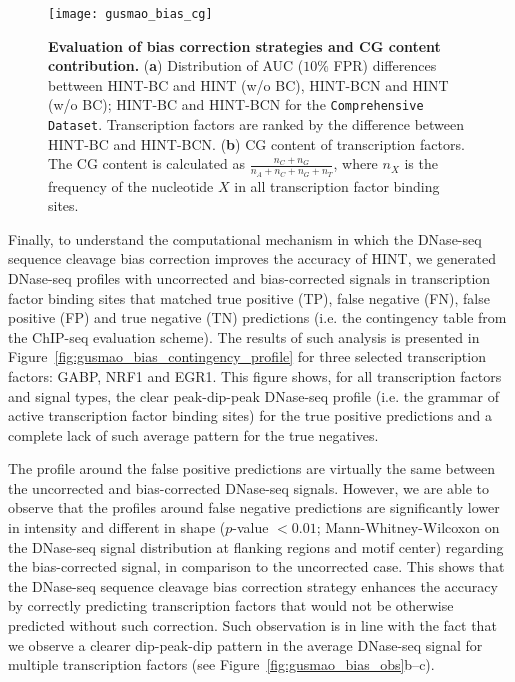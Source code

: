 \begin{figure}[h!]
\centering
\texttt{[image: gusmao\_bias\_cg]}
\caption[Evaluation of bias correction strategies and CG content contribution]{\textbf{Evaluation of bias correction strategies and CG content contribution.} (\textbf{a}) Distribution of AUC ($10\%$ FPR) differences bettween HINT-BC and HINT (w/o BC), HINT-BCN and HINT (w/o BC); HINT-BC and HINT-BCN for the {\tt Comprehensive Dataset}. Transcription factors are ranked by the difference between HINT-BC and HINT-BCN. (\textbf{b}) CG content of transcription factors. The CG content is calculated as $\frac{n_C+n_G}{n_A+n_C+n_G+n_T}$, where $n_X$ is the frequency of the nucleotide $X$ in all transcription factor binding sites.}
\label{fig:gusmao_bias_cg}
\end{figure}

Finally, to understand the computational mechanism in which the DNase-seq sequence cleavage bias correction improves the accuracy of HINT, we generated DNase-seq profiles with uncorrected and bias-corrected signals in transcription factor binding sites that matched true positive (TP), false negative (FN), false positive (FP) and true negative (TN) predictions (i.e. the contingency table from the ChIP-seq evaluation scheme). The results of such analysis is presented in Figure~\ref{fig:gusmao_bias_contingency_profile} for three selected transcription factors: GABP, NRF1 and EGR1. This figure shows, for all transcription factors and signal types, the clear peak-dip-peak DNase-seq profile (i.e. the grammar of active transcription factor binding sites) for the true positive predictions and a complete lack of such average pattern for the true negatives.

The profile around the false positive predictions are virtually the same between the uncorrected and bias-corrected DNase-seq signals. However, we are able to observe that the profiles around false negative predictions are significantly lower in intensity and different in shape ($p$-value $< 0.01$; Mann-Whitney-Wilcoxon on the DNase-seq signal distribution at flanking regions and motif center) regarding the bias-corrected signal, in comparison to the uncorrected case. This shows that the DNase-seq sequence cleavage bias correction strategy enhances the accuracy by correctly predicting transcription factors that would not be otherwise predicted without such correction. Such observation is in line with the fact that we observe a clearer dip-peak-dip pattern in the average DNase-seq signal for multiple transcription factors (see Figure~\ref{fig:gusmao_bias_obs}b--c).

